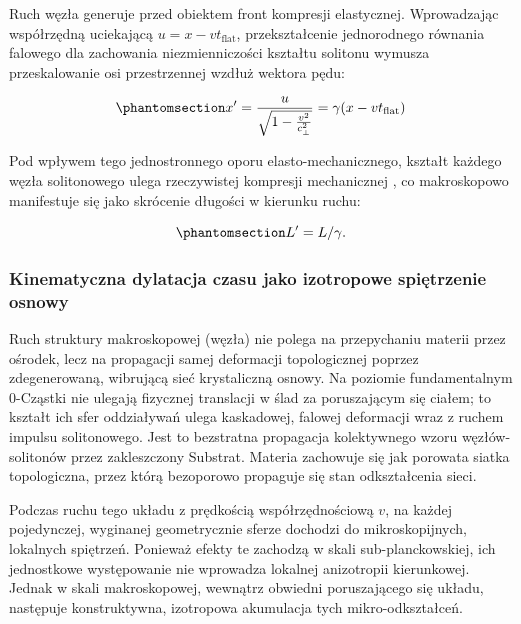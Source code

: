 \documentclass[
  polish,
  letterpaper,
  DIV=11,
  numbers=noendperiod,
  oneside]{scrartcl}
\begin{document}
Ruch węzła generuje przed obiektem front kompresji elastycznej.
Wprowadzając współrzędną uciekającą \(u = x - vt_{\text{flat}}\),
przekształcenie jednorodnego równania falowego dla zachowania
niezmienniczości kształtu solitonu wymusza przeskalowanie osi
przestrzennej wzdłuż wektora pędu:

\begin{equation}\protect\phantomsection\label{eq-1-4-6}{x' = \frac{u}{\sqrt{1 - \frac{v^2}{c_{\perp}^2}}} = \gamma (x - vt_{\text{flat}})}\end{equation}

Pod wpływem tego jednostronnego oporu elasto-mechanicznego, kształt
każdego węzła solitonowego ulega rzeczywistej kompresji mechanicznej ,
co makroskopowo manifestuje się jako skrócenie długości w kierunku
ruchu:

\begin{equation}\protect\phantomsection\label{eq-1-4-6a}{L' = L / \gamma.}\end{equation}

\subsubsection{Kinematyczna dylatacja czasu jako izotropowe spiętrzenie
osnowy}\label{sec-1-4-3}

Ruch struktury makroskopowej (węzła) nie polega na przepychaniu materii
przez ośrodek, lecz na propagacji samej deformacji topologicznej poprzez
zdegenerowaną, wibrującą sieć krystaliczną osnowy. Na poziomie
fundamentalnym 0-Cząstki nie ulegają fizycznej translacji w ślad za
poruszającym się ciałem; to kształt ich sfer oddziaływań ulega
kaskadowej, falowej deformacji wraz z ruchem impulsu solitonowego. Jest
to bezstratna propagacja kolektywnego wzoru węzłów-solitonów przez
zakleszczony Substrat. Materia zachowuje się jak porowata siatka
topologiczna, przez którą bezoporowo propaguje się stan odkształcenia
sieci.

Podczas ruchu tego układu z prędkością współrzędnościową \(v\), na
każdej pojedynczej, wyginanej geometrycznie sferze dochodzi do
mikroskopijnych, lokalnych spiętrzeń. Ponieważ efekty te zachodzą w
skali sub-planckowskiej, ich jednostkowe występowanie nie wprowadza
lokalnej anizotropii kierunkowej. Jednak w skali makroskopowej, wewnątrz
obwiedni poruszającego się układu, następuje konstruktywna, izotropowa
akumulacja tych mikro-odkształceń.
\end{document}
